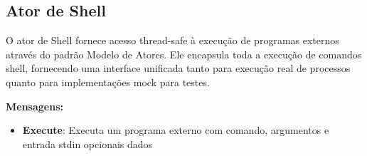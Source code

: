 \subsection{Ator de Shell}

O ator de Shell fornece acesso thread-safe à execução de programas externos através do padrão Modelo de Atores. Ele encapsula toda a execução de comandos shell, fornecendo uma interface unificada tanto para execução real de processos quanto para implementações mock para testes.

\textbf{Mensagens:}

\begin{itemize}
    \item \textbf{Execute}: Executa um programa externo com comando, argumentos e entrada stdin opcionais dados
\end{itemize}
